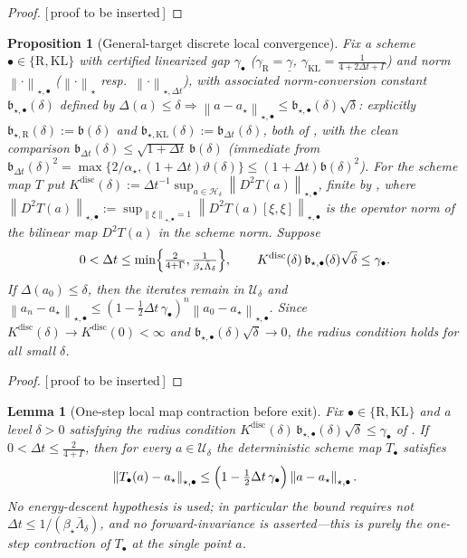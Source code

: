 \documentclass[11pt]{article}
\theoremstyle{plain}
\newtheorem{proposition}[proposition]{Proposition}
\newtheorem{lemma}[lemma]{Lemma}
\theoremstyle{definition}
\theoremstyle{remark}
\newcommand{\KL}{\mathrm{KL}}
\newcommand{\Riem}{\mathrm{R}}
\newcommand{\norm}[1]{\left\lVert #1\right\rVert}
\newcommand{\Ureg}{\mathcal{U}}
\newcommand{\Hreg}{\mathcal{H}}
\newcommand{\gund}{\underline{\gamma}}
\newcommand{\Kdisc}{K^{\mathrm{disc}}}
\newcommand{\PROOFHOLE}{{\color{red}\textsf{[\,proof to be inserted\,]}}}
\begin{document}
\begin{proof}
\PROOFHOLE
\end{proof}

\begin{proposition}[General-target discrete local convergence]
\label{thm:disc-local}
Fix a scheme $\bullet\in\{\Riem,\KL\}$ with certified linearized gap $\gamma_\bullet$
($\gamma_{\Riem}=\gund$, $\gamma_{\KL}=\tfrac1{4+2\Delta t+\Gamma}$) and norm $\norm\cdot_{\star,\bullet}$
($\norm\cdot_\star$ resp.\ $\norm\cdot_{\star,\Delta t}$), with associated norm-conversion constant
$\mathfrak b_{\star,\bullet}(\delta)$ defined by $\Delta(a)\leq\delta\Rightarrow\norm{a-a_\star}_{\star,\bullet}\leq\mathfrak b_{\star,\bullet}(\delta)\sqrt\delta$:
explicitly $\mathfrak b_{\star,\Riem}(\delta):=\mathfrak b(\delta)$ and
$\mathfrak b_{\star,\KL}(\delta):=\mathfrak b_{\Delta t}(\delta)$, both of , with the clean
comparison $\mathfrak b_{\Delta t}(\delta)\leq\sqrt{1+\Delta t}\,\mathfrak b(\delta)$ (immediate from
$\mathfrak b_{\Delta t}(\delta)^2=\max\{2/\alpha_\star,(1+\Delta t)\vartheta(\delta)\}\leq(1+\Delta t)\mathfrak b(\delta)^2$).
For the scheme map $T$ put
$\Kdisc(\delta):=\Delta t^{-1}\sup_{a\in\Hreg_\delta}\norm{D^2T(a)}_{\star,\bullet}$, finite by
, where $\norm{D^2T(a)}_{\star,\bullet}:=\sup_{\norm\xi_{\star,\bullet}=1}\norm{D^2T(a)[\xi,\xi]}_{\star,\bullet}$
is the operator norm of the bilinear map $D^2T(a)$ in the scheme norm. Suppose
\[
    0<\Delta t\leq\min\Bigl\{\tfrac2{4+\Gamma},\tfrac1{\beta_\star\bar\Lambda_\delta}\Bigr\},
    \qquad
    \Kdisc(\delta)\,\mathfrak b_{\star,\bullet}(\delta)\sqrt\delta\leq\gamma_\bullet .
\]
If $\Delta(a_0)\leq\delta$, then the iterates remain in $\Ureg_\delta$ and
$\norm{a_n-a_\star}_{\star,\bullet}\leq(1-\tfrac12\Delta t\,\gamma_\bullet)^n\norm{a_0-a_\star}_{\star,\bullet}$.
Since $\Kdisc(\delta)\to\Kdisc(0)<\infty$ and $\mathfrak b_{\star,\bullet}(\delta)\sqrt\delta\to0$, the
radius condition holds for all small $\delta$.
\end{proposition}

\begin{proof}
\PROOFHOLE
\end{proof}

\begin{lemma}[One-step local map contraction before exit]
\label{lem:local-map-contraction}
Fix $\bullet\in\{\Riem,\KL\}$ and a level $\delta>0$ satisfying the radius condition
$\Kdisc(\delta)\,\mathfrak b_{\star,\bullet}(\delta)\sqrt\delta\leq\gamma_\bullet$ of .
If $0<\Delta t\leq\tfrac2{4+\Gamma}$, then for \emph{every} $a\in\Ureg_\delta$ the deterministic scheme
map $T_\bullet$ satisfies
\[
    \norm{T_\bullet(a)-a_\star}_{\star,\bullet}\leq\Bigl(1-\tfrac12\Delta t\,\gamma_\bullet\Bigr)\norm{a-a_\star}_{\star,\bullet}.
\]
No energy-descent hypothesis is used; in particular the bound requires \emph{not}
$\Delta t\leq1/(\beta_\star\bar\Lambda_\delta)$, and no forward-invariance is asserted---this is purely
the one-step contraction of $T_\bullet$ at the single point $a$.
\end{lemma}
\end{document}
